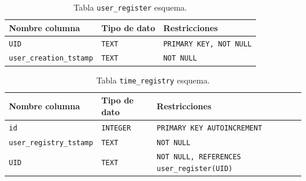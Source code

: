 \documentclass{article}
\begin{document}
\begin{table}[H]
	\centering
	\begin{tabular}{|l|l|l|}
	\hline
	\textbf{Nombre columna} & \textbf{Tipo de dato} & \textbf{Restricciones} \\ \hline
	\texttt{UID} & \texttt{TEXT} & \texttt{PRIMARY KEY, NOT NULL} \\ \hline
	\texttt{user\_creation\_tstamp} & \texttt{TEXT} & \texttt{NOT NULL} \\ \hline
	\end{tabular}
	\caption{Tabla \texttt{user\_register} esquema.}
	\end{table}

\begin{table}[H]
	\centering
	\begin{tabular}{|l|l|p{8cm}|}
	\hline
	\textbf{Nombre columna} & \textbf{Tipo de dato} & \textbf{Restricciones} \\ \hline
	\texttt{id} & \texttt{INTEGER} & \texttt{PRIMARY KEY AUTOINCREMENT} \\ \hline
	\texttt{user\_registry\_tstamp} & \texttt{TEXT} & \texttt{NOT NULL} \\ \hline
	\texttt{UID} & \texttt{TEXT} & \texttt{NOT NULL, REFERENCES user\_register(UID)} \\ \hline
	\end{tabular}
	\caption{Tabla \texttt{time\_registry} esquema.}
	\end{table}
\end{document}
